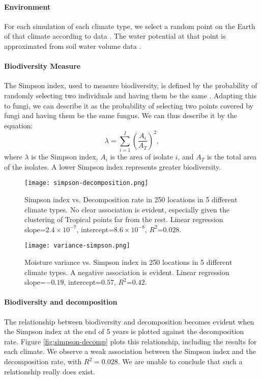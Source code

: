\documentclass[12pt]{article}
\begin{document}
\paragraph{Environment}
For each simulation of each climate type, we select a random point on the Earth of that climate according to data \cite{koppen}. The water potential at that point is approximated from soil water volume data \cite{moisture}.
\paragraph{Biodiversity Measure}
The Simpson index, used to measure biodiversity, is defined by the probability of randomly selecting two individuals and having them be the same \cite{simpson}. Adapting this to fungi, we can describe it as the probability of selecting two points covered by fungi and having them be the same fungus. We can thus describe it by the equation:
\begin{equation*}
    \lambda=\sum_{i=1}^I \left(\frac{A_i}{A_T}\right)^2,
\end{equation*}
where $\lambda$ is the Simpson index, $A_i$ is the area of isolate $i$, and $A_T$ is the total area of the isolates. A lower Simpson index represents greater biodiversity.

\begin{figure}[!h]
 \centering
 \begin{minipage}{0.49\textwidth}
    \centering
    \texttt{[image: simpson-decomposition.png]}
    \caption{Simpson index vs. Decomposition rate in 250 locations in 5 different climate types. No clear association is evident, especially given the clustering of Tropical points far from the rest. Linear regression slope=$2.4\times 10^{-7}$, intercept=$8.6\times 10^{-8}$, $R^2$=$0.028$.} \label{fig:simpson-decomp}
 \end{minipage}\hfill
 \begin{minipage}{0.49\textwidth}
    \centering
    \texttt{[image: variance-simpson.png]}
    \caption{Moisture variance vs. Simpson index in 250 locations in 5 different climate types. A negative association is evident. Linear regression slope=$-0.19$, intercept=$0.57$, $R^2$=$0.42$.}\label{fig:variance-simpson}
 \end{minipage}
 \end{figure}  

\paragraph{Biodiversity and decomposition}
The relationship between biodiversity and decomposition becomes evident when the Simpson index at the end of 5 years is plotted against the decomposition rate. Figure \ref{fig:simpson-decomp} plots this relationship, including the results for each climate. We observe a weak association between the Simpson index and the decomposition rate, with $R^2=0.028$. We are unable to conclude that such a relationship really does exist.
\end{document}
